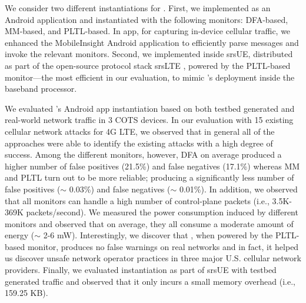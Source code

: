 We consider two different instantiations for \system.
First, we implemented \system as an Android application and instantiated with the following monitors:
DFA-based, %
MM-based, %
and PLTL-based. %
In \system app, for capturing in-device cellular traffic,
we enhanced the MobileInsight Android \cite{mobile_insight} application
to efficiently parse messages and invoke the relevant monitors.
Second, we implemented \system inside srsUE, distributed as part of
the open-source protocol stack
srsLTE \cite{gomez2016srslte}, powered by
the PLTL-based monitor---the most efficient in our evaluation,
to mimic \system{}'s deployment inside the baseband processor.


We evaluated \system{}'s Android app instantiation based on both testbed generated
and real-world network traffic in 3 COTS devices. In our evaluation with 15
existing cellular network attacks for 4G LTE,
we observed that in general all of the approaches were able to identify the existing
attacks with a high degree of success. Among the different monitors, however,
DFA on average produced a higher number of false positives
(21.5\%) and false negatives (17.1\%) whereas MM and PLTL
turn out to be more reliable; producing a significantly less number of false positives
($\sim\!\!$ 0.03\%) and false negatives ($\sim\!\!$ 0.01\%).
In addition, we observed that all monitors can handle a high number of
control-plane packets (i.e., 3.5K-369K packets/second).
We measured the power consumption induced by different monitors
and observed that on average, they all consume a moderate amount of energy ($\sim\!\!\!$ 2-6 mW).
Interestingly, we discover that \system, when powered by the PLTL-based monitor,
	produces no false warnings on real networks and in fact, it helped us discover
	unsafe network operator practices in three major U.S. cellular network providers.
Finally, we evaluated \system instantiation as part of  srsUE \cite{gomez2016srslte} with testbed
generated traffic and observed that it only incurs a small memory overhead (i.e., 159.25 KB).


